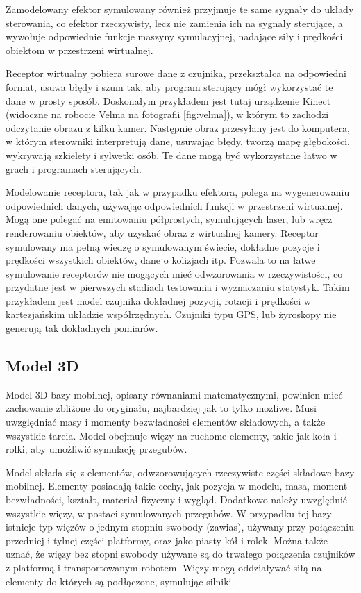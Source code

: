 	Zamodelowany efektor symulowany również przyjmuje te same sygnały do układy sterowania, co efektor rzeczywisty, 
	lecz nie zamienia ich na sygnały sterujące, a wywołuje odpowiednie funkcje maszyny symulacyjnej, nadające siły i prędkości obiektom w przestrzeni wirtualnej.

	Receptor wirtualny pobiera surowe dane z czujnika, przekształca na odpowiedni format, usuwa błędy i szum tak, aby program sterujący mógł wykorzystać te dane w prosty sposób. 
	Doskonałym przykładem jest tutaj urządzenie Kinect (widoczne na robocie Velma na fotografii \ref{fig:velma}), w którym to zachodzi odczytanie obrazu z kilku kamer.
	Następnie obraz przesyłany jest do komputera, w którym sterowniki interpretują dane, usuwając błędy, tworzą mapę głębokości, wykrywają szkielety i sylwetki osób.
	Te dane mogą być wykorzystane łatwo w grach i programach sterujących.

	Modelowanie receptora, tak jak w przypadku efektora, polega na wygenerowaniu odpowiednich danych, używając odpowiednich funkcji w przestrzeni wirtualnej.
	Mogą one polegać na emitowaniu półprostych, symulujących laser, lub wręcz renderowaniu obiektów, aby uzyskać obraz z wirtualnej kamery.
	Receptor symulowany ma pełną wiedzę o symulowanym świecie, dokładne pozycje i prędkości wszystkich obiektów, dane o kolizjach itp. 
	Pozwala to na łatwe symulowanie receptorów nie mogących mieć odwzorowania w rzeczywistości, co przydatne jest w pierwszych stadiach testowania i wyznaczaniu statystyk.
	Takim przykładem jest model czujnika dokładnej pozycji, rotacji i prędkości w kartezjańskim układzie współrzędnych. 
	Czujniki typu GPS, lub żyroskopy nie generują tak dokładnych pomiarów.

	\subsection{Model 3D}
	Model 3D bazy mobilnej, opisany równaniami matematycznymi, powinien mieć zachowanie zbliżone do oryginału, najbardziej jak to tylko możliwe.
	Musi uwzględniać masy i momenty bezwładności elementów składowych, a także wszystkie tarcia.
	Model obejmuje więzy na ruchome elementy, takie jak koła i rolki, aby umożliwić symulację przegubów.

	Model składa się z elementów, odwzorowujących rzeczywiste części składowe bazy mobilnej.
	Elementy posiadają takie cechy, jak pozycja w modelu, masa, moment bezwładności, kształt, materiał fizyczny i wygląd.
	Dodatkowo należy uwzględnić wszystkie więzy, w postaci symulowanych przegubów.
	W przypadku tej bazy istnieje typ więzów o jednym stopniu swobody (zawias), używany przy połączeniu przedniej i tylnej części platformy, oraz 
	jako piasty kół i rolek. Można także uznać, że więzy bez stopni swobody używane są do trwałego połączenia czujników z platformą i transportowanym robotem.
	Więzy mogą oddziaływać siłą na elementy do których są podłączone, symulując silniki.


